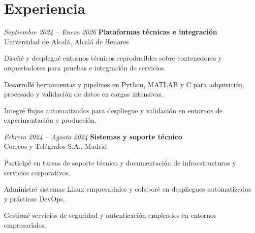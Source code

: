 \vspace{-7pt}

\section{Experiencia}

\begin{twocolentry}{\textit{Septiembre 2024 – Enero 2026}}
	\textbf{Plataformas técnicas e integración} \\
	Universidad de Alcalá, Alcalá de Henares
\end{twocolentry}
\begin{onecolentry}
	\begin{highlights}
		\item Diseñé y desplegué entornos técnicos reproducibles sobre contenedores y orquestadores para pruebas e integración de servicios.
		\item Desarrollé herramientas y pipelines en Python, MATLAB y C para adquisición, procesado y validación de datos en cargas intensivas.
		\item Integré flujos automatizados para despliegue y validación en entornos de experimentación y producción.
	\end{highlights}
\end{onecolentry}

\vspace{0.2 cm}

\begin{twocolentry}{\textit{Febrero 2024 – Agosto 2024}}
	\textbf{Sistemas y soporte técnico} \\
	Correos y Telégrafos S.A., Madrid
\end{twocolentry}
\begin{onecolentry}
	\begin{highlights}
		\item Participé en tareas de soporte técnico y documentación de infraestructuras y servicios corporativos.
		\item Administré sistemas Linux empresariales y colaboré en despliegues automatizados y prácticas DevOps.
		\item Gestioné servicios de seguridad y autenticación empleados en entornos empresariales.
	\end{highlights}
\end{onecolentry}

\vspace{0.2 cm}

